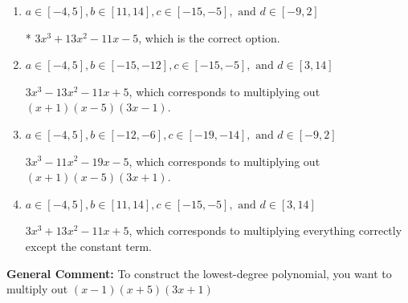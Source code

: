\documentclass{extbook}[14pt]
\begin{document}
\begin{enumerate}
{\begin{enumerate}[label=\Alph*.]
$3x^{3} +19 x^{2} +21 x + 5$, which corresponds to multiplying out $(x + 1)(x + 5)(3x + 1)$.
\item \( a \in [-4, 5], b \in [11, 14], c \in [-15, -5], \text{ and } d \in [-9, 2] \)

* $3x^{3} +13 x^{2} -11 x -5$, which is the correct option.
\item \( a \in [-4, 5], b \in [-15, -12], c \in [-15, -5], \text{ and } d \in [3, 14] \)

$3x^{3} -13 x^{2} -11 x + 5$, which corresponds to multiplying out $(x + 1)(x -5)(3x -1)$.
\item \( a \in [-4, 5], b \in [-12, -6], c \in [-19, -14], \text{ and } d \in [-9, 2] \)

$3x^{3} -11 x^{2} -19 x -5$, which corresponds to multiplying out $(x + 1)(x -5)(3x + 1)$.
\item \( a \in [-4, 5], b \in [11, 14], c \in [-15, -5], \text{ and } d \in [3, 14] \)

$3x^{3} +13 x^{2} -11 x + 5$, which corresponds to multiplying everything correctly except the constant term.
\end{enumerate}

\textbf{General Comment:} To construct the lowest-degree polynomial, you want to multiply out $(x -1)(x + 5)(3x + 1)$
}
\end{enumerate}
\end{document}
